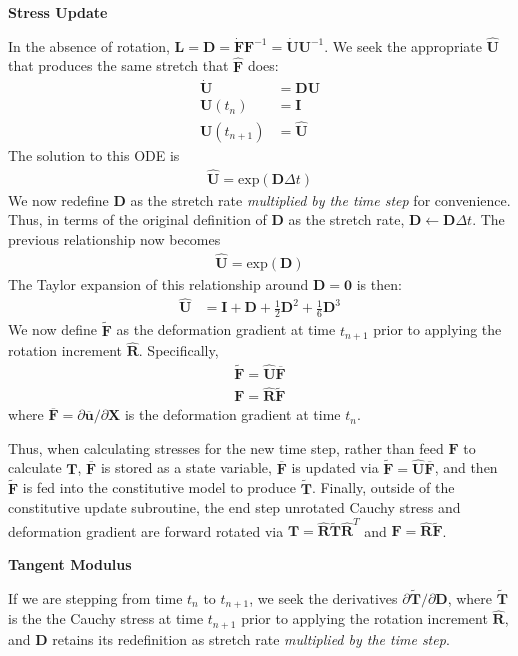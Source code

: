 \textbf{Stress Update}

In the absence of rotation, ${\bm L} = {\bm D} = \dot{\bm F}{\bm F}^{-1} = \dot{\bm U}{\bm U}^{-1}$. We seek the appropriate $\hat{\bm U}$ that produces the same stretch that $\hat{\bm F}$ does:
\begin{align}
\dot{\bm U} &= {\bm D}{\bm U} \\
{\bm U}(t_n) &= {\bm I} \\
{\bm U}(t_{n+1}) &= \hat{\bm U}
\end{align}
The solution to this ODE is
\begin{align}
\hat{\bm U} = \text{exp}({\bm D}\Delta t)
\end{align}
We now redefine ${\bm D}$ as the stretch rate \textit{multiplied by the time step} for convenience. Thus, in terms of the original definition of ${\bm D}$ as the stretch rate, ${\bm D}\leftarrow{\bm D}\Delta t$. The previous relationship now becomes 
\begin{align}
\hat{\bm U} = \text{exp}({\bm D})
\end{align}
The Taylor expansion of this relationship around $\bm{D} = \bm{0}$ is then:
\begin{align}
\hat{\bm {U}} &= {\bm I} + {\bm D} + \frac{1}{2}{\bm D}^2 + \frac{1}{6}{\bm D}^3
\end{align}
We now define $\tilde {\bm F}$ as the deformation gradient at time $t_{n+1}$ prior to applying the rotation increment $\hat{\bm R}$. Specifically,
\begin{align}
\tilde {\bm F} = \hat{\bm U}\overline{\bm F} \\
{\bm F} = \hat{\bm R}\tilde {\bm F}
\end{align}
where $\overline{\bm F} = \partial {\overline{{\bm u}}}/\partial {\bm X}$ is the deformation gradient at time $t_n$.

Thus, when calculating stresses for the new time step, rather than feed ${\bm F}$ to calculate ${\bm T}$, $\overline {\bm F}$ is stored as a state variable, $\overline{\bm F}$ is updated via $\tilde {\bm F} = \hat{\bm U}\overline{\bm F} $, and then $\tilde{\bm{F}}$ is fed into the constitutive model to produce $\tilde{\bm T}$. Finally, outside of the constitutive update subroutine, the end step unrotated Cauchy stress and deformation gradient are forward rotated via ${\bm T} = \hat{\bm R}\tilde{\bm T}\hat{\bm R}^T$ and $\bm{F} = \hat{\bm{R}}\tilde{\bm{F}}$.

\textbf{Tangent Modulus}

If we are stepping from time $t_n$ to $t_{n+1}$, we seek the derivatives $\partial{\tilde{\bm T}}/\partial {\bm D}$, where $\tilde{\bm T}$ is the the Cauchy stress at time $t_{n+1}$ prior to applying the rotation increment $\hat{\bm R}$, and ${\bm D}$ retains its redefinition as stretch rate \textit{multiplied by the time step}.

